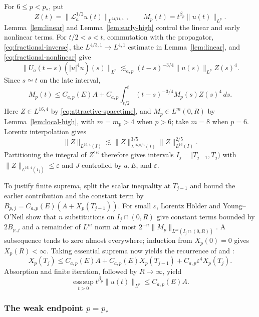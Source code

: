 \documentclass[preprint,12pt]{elsarticle}
\numberwithin{equation}{section}
\theoremstyle{definition}
\theoremstyle{remark}
\newcommand{\cL}{\mathcal L}
\newcommand{\norm}[2]{\lVert #1\rVert_{#2}}
\newcommand{\eps}{\varepsilon}
\begin{document}
For $6\leq p<p_*$, put
\[
 Z(t)=\norm{\cL_a^{1/2}u(t)}{L^{24/11,4}},
 \qquad
 M_p(t)=t^{\beta_p}\norm{u(t)}{L^p}.
\]
Lemma~\ref{lem:linear} and Lemma~\ref{lem:early-high} control the
linear and early nonlinear terms. For $t/2<s<t$, commutation with
the propagator, \eqref{eq:fractional-inverse}, the
$L^{4/3,1}\to L^{4,1}$ estimate in Lemma~\ref{lem:linear}, and
\eqref{eq:fractional-nonlinear} give
\[
 \norm{U_a(t-s)(|u|^4u)(s)}{L^p}
 \lesssim_{a,p}(t-s)^{-3/4}\norm{u(s)}{L^p}Z(s)^4.
\]
Since $s\simeq t$ on the late interval,
\[
 M_p(t)\leq C_{a,p}(E)A+
 C_{a,p}\int_{t/2}^t(t-s)^{-3/4}M_p(s)Z(s)^4\,ds.
\]
Here $Z\in L^{16,4}$ by \eqref{eq:attractive-spacetime}, and
$M_p\in L^m(0,R)$ by Lemma~\ref{lem:local-high}, with $m=m_p>4$
when $p>6$; take $m=8$ when $p=6$.
Lorentz interpolation gives
\[
 \norm{Z}{L^{16,4}(I)}
 \lesssim \norm{Z}{L^{16,8/3}(I)}^{3/5}
 \norm{Z}{L^{16}(I)}^{2/5}.
\]
Partitioning the integral of $Z^{16}$ therefore gives intervals
$I_j=[T_{j-1},T_j)$ with $\norm{Z}{L^{16,4}(I_j)}\leq\eps$ and
$J$ controlled by $a,E$, and $\eps$.

To justify finite suprema, split the scalar inequality at
$T_{j-1}$ and bound the earlier contribution and the constant term
by $B_{p,j}=C_{a,p}(E)(A+X_p(T_{j-1}))$. For small $\eps$,
Lorentz H\"older and Young--O'Neil \cite[Theorems~3.4--3.6]{ONeil}
show that $n$ substitutions on $I_j\cap(0,R)$ give constant terms
bounded by $2B_{p,j}$ and a remainder of $L^m$ norm at most
$2^{-n}\norm{M_p}{L^m(I_j\cap(0,R))}$. A subsequence tends to zero
almost everywhere; induction from $X_p(0)=0$ gives $X_p(R)<\infty$.
Taking essential suprema now yields the recurrence of
\cite[Section~3.2]{Kowalski} and \cite[Section~4.2]{WangXuZhang}:
\[
 X_p(T_j)
 \leq C_{a,p}(E)A+C_{a,p}(E)X_p(T_{j-1})
 +C_{a,p}\eps^4X_p(T_j).
\]
Absorption and finite iteration, followed by $R\to\infty$, yield
\[
 \operatorname*{ess\,sup}_{t>0}
 t^{\beta_p}\norm{u(t)}{L^p}
 \leq C_{a,p}(E)A.
\]

\subsubsection{\texorpdfstring{The weak endpoint $p=p_*$}%
 {The weak endpoint p = p*}}
\end{document}
